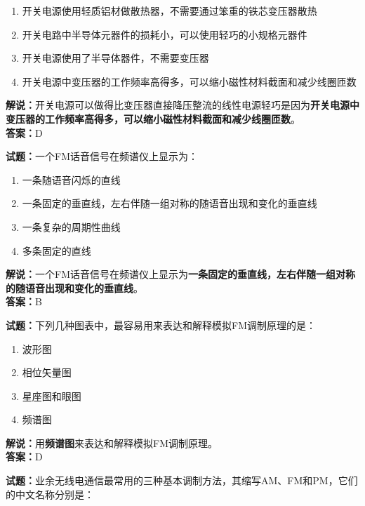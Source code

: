 \documentclass{ctexbook}
\begin{document}
\begin{enumerate}[leftmargin=3em]
	\item 开关电源使用轻质铝材做散热器，不需要通过笨重的铁芯变压器散热
	\item 开关电路中半导体元器件的损耗小，可以使用轻巧的小规格元器件
	\item 开关电源使用了半导体器件，不需要变压器
	\item 开关电源中变压器的工作频率高得多，可以缩小磁性材料截面和减少线圈匝数
\end{enumerate}

\noindent\textbf{解说：}开关电源可以做得比变压器直接降压整流的线性电源轻巧是因为\textbf{开关电源中变压器的工作频率高得多，可以缩小磁性材料截面和减少线圈匝数}。\\\noindent\textbf{答案：}D%


\bigskip


\noindent\textbf{试题：}一个FM话音信号在频谱仪上显示为：

\begin{enumerate}[leftmargin=3em]
	\item 一条随语音闪烁的直线
	\item 一条固定的垂直线，左右伴随一组对称的随语音出现和变化的垂直线
	\item 一条复杂的周期性曲线
	\item 多条固定的直线
\end{enumerate}

\noindent\textbf{解说：}一个FM话音信号在频谱仪上显示为\textbf{一条固定的垂直线，左右伴随一组对称的随语音出现和变化的垂直线}。\\\noindent\textbf{答案：}B%


\bigskip


\noindent\textbf{试题：}下列几种图表中，最容易用来表达和解释模拟FM调制原理的是：

\begin{enumerate}[leftmargin=3em]
	\item 波形图
	\item 相位矢量图
	\item 星座图和眼图
	\item 频谱图
\end{enumerate}

\noindent\textbf{解说：}用\textbf{频谱图}来表达和解释模拟FM调制原理。\\\noindent\textbf{答案：}D%


\bigskip


\noindent\textbf{试题：}业余无线电通信最常用的三种基本调制方法，其缩写AM、FM和PM，它们的中文名称分别是：
\end{document}
